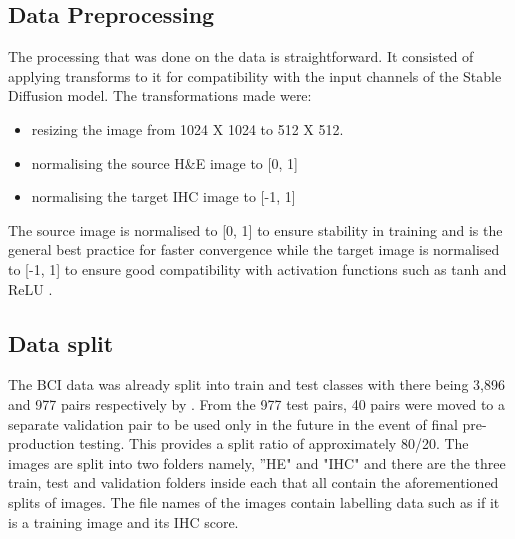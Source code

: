 \subsection{Data Preprocessing}

The processing that was done on the data is straightforward. It consisted of applying transforms to it for compatibility with the input channels of the Stable Diffusion model. The transformations made were:

\begin{itemize}
    \item resizing the image from 1024 X 1024 to 512 X 512.
    \item normalising the source H\&E image to [0, 1]
    \item normalising the target IHC image to [-1, 1]
\end{itemize}

The source image is normalised to [0, 1] to ensure stability in training and is the general best practice for faster convergence while the target image is normalised to [-1, 1] to ensure good compatibility with activation functions such as tanh and ReLU  \parencite{Goodfellow2016DeepLearning}.

\subsection{Data split}

The BCI data was already split into train and test classes with there being 3,896 and 977 pairs respectively by \textcite{Liu2022BCI:Pix2pix}. From the 977 test pairs, 40 pairs were moved to a separate validation pair to be used only in the future in the event of final pre-production testing. This provides a split ratio of approximately 80/20. The images are split into two folders namely, ''HE" and "IHC" and there are the three train, test and validation folders inside each that all contain the aforementioned splits of images. The file names of the images contain labelling data such as if it is a training image and its IHC score.

